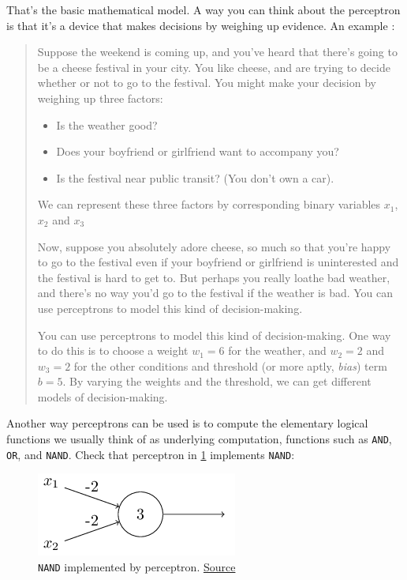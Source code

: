 \documentclass[a4paper]{tufte-handout}
\begin{document}
That's the basic mathematical model. A way you can think about the
perceptron is that it's a device that makes decisions by weighing up
evidence. An example
:

\begin{quote}
Suppose the weekend is coming up, and you've heard that there's going to be a cheese festival in your city. You like cheese, and are trying to decide whether or not to go to the festival. You might make your decision by weighing up three factors:

\begin{itemize}
\item Is the weather good?
\item Does your boyfriend or girlfriend want to accompany you?
\item Is the festival near public transit? (You don't own a car).
\end{itemize}
We can represent these three factors by corresponding binary variables \(x_1\), \(x_2\) and \(x_3\)
 
Now, suppose you absolutely adore cheese, so much so that you're happy to go to the festival even if your boyfriend or girlfriend is uninterested and the festival is hard to get to. But perhaps you really loathe bad weather, and there's no way you'd go to the festival if the weather is bad. You can use perceptrons to model this kind of decision-making.
 
You can use perceptrons to model this kind of decision-making. One way to do this is to choose a weight \(w_1=6\) for the weather, and \(w_2=2\) and \(w_3=2\) for the other conditions and threshold (or more aptly, \emph{bias}) term \(b = 5\). By varying the weights and the threshold, we can get different models of decision-making.
\end{quote}


Another way perceptrons can be used is to compute the elementary logical
functions we usually think of as underlying computation, functions such
as \texttt{AND}, \texttt{OR}, and \texttt{NAND}. Check that
perceptron in \ref{fig:nand} implements \texttt{NAND}:

\begin{figure}
  \includegraphics[width=0.5\linewidth]{tikz2}
  \caption{\texttt{NAND} implemented by perceptron.
\href{http://neuralnetworksanddeeplearning.com/chap1.html}{Source} }
\label{fig:nand}
\end{figure}
\end{document}
